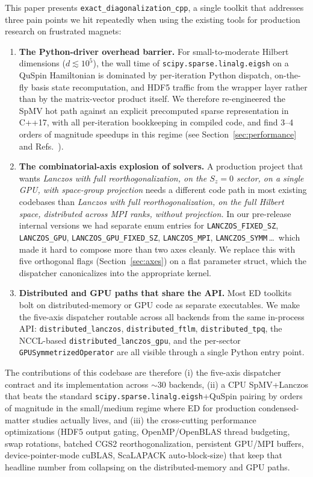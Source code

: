 \documentclass[submission, PhysCodeb]{SciPost}
\begin{document}
This paper presents \texttt{exact\_diagonalization\_cpp}, a single
toolkit that addresses three pain points we hit repeatedly when using
the existing tools for production research on frustrated magnets:

\begin{enumerate}[leftmargin=2.2em]
\item \textbf{The Python-driver overhead barrier.} For
small-to-moderate Hilbert dimensions ($d \lesssim 10^5$), the wall
time of \texttt{scipy.sparse.linalg.eigsh} on a QuSpin Hamiltonian is
dominated by per-iteration Python dispatch, on-the-fly basis state
recomputation, and HDF5 traffic from the wrapper layer rather than by
the matrix-vector product itself. We therefore re-engineered the SpMV
hot path against an explicit precomputed sparse representation in
C++17, with all per-iteration bookkeeping in compiled code, and find
3--4 orders of magnitude speedups in this regime
(see Section~\ref{sec:performance} and Refs.~\cite{Weinberg2017QuSpin,Wietek2025XDiag}).

\item \textbf{The combinatorial-axis explosion of solvers.} A
production project that wants \emph{Lanczos with full
reorthogonalization, on the $S_z = 0$ sector, on a single GPU, with
space-group projection} needs a different code path in most existing
codebases than \emph{Lanczos with full reorthogonalization, on the
full Hilbert space, distributed across MPI ranks, without
projection.} In our pre-release internal versions we had separate
enum entries for \texttt{LANCZOS\_FIXED\_SZ}, \texttt{LANCZOS\_GPU},
\texttt{LANCZOS\_GPU\_FIXED\_SZ}, \texttt{LANCZOS\_MPI},
\texttt{LANCZOS\_SYMM}\,\dots\ which made it hard to compose more than
two axes cleanly. We replace this with five orthogonal flags
(Section~\ref{sec:axes}) on a flat parameter struct, which the
dispatcher canonicalizes into the appropriate kernel.

\item \textbf{Distributed and GPU paths that share the API.} Most ED
toolkits bolt on distributed-memory or GPU code as separate
executables. We make the five-axis dispatcher routable across all
backends from the same in-process API: \texttt{distributed\_lanczos},
\texttt{distributed\_ftlm}, \texttt{distributed\_tpq}, the NCCL-based
\texttt{distributed\_lanczos\_gpu}, and the per-sector
\texttt{GPUSymmetrizedOperator} are all visible through a single
Python entry point.
\end{enumerate}

The contributions of this codebase are therefore (i) the five-axis
dispatcher contract and its implementation across $\sim$30 backends,
(ii) a CPU SpMV+Lanczos that beats the standard
\texttt{scipy.sparse.linalg.eigsh}+QuSpin pairing by orders of
magnitude in the small/medium regime where ED for production
condensed-matter studies actually lives, and (iii) the cross-cutting
performance optimizations (HDF5 output gating, OpenMP/OpenBLAS thread
budgeting, swap rotations, batched CGS2 reorthogonalization, persistent
GPU/MPI buffers, device-pointer-mode cuBLAS, ScaLAPACK auto-block-size)
that keep that headline number from collapsing on the
distributed-memory and GPU paths.
\end{document}
